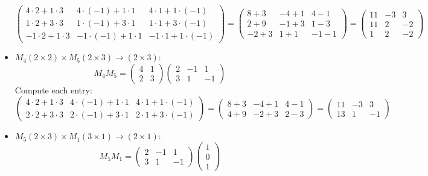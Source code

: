 \documentclass{article}
\begin{document}
\begin{itemize}
\[\begin{pmatrix}
        4 \cdot 2 + 1 \cdot 3 & 4 \cdot (-1) + 1 \cdot 1 & 4 \cdot 1 + 1 \cdot (-1) \\
        1 \cdot 2 + 3 \cdot 3 & 1 \cdot (-1) + 3 \cdot 1 & 1 \cdot 1 + 3 \cdot (-1) \\
        -1 \cdot 2 + 1 \cdot 3 & -1 \cdot (-1) + 1 \cdot 1 & -1 \cdot 1 + 1 \cdot (-1)
    \end{pmatrix}
    = \begin{pmatrix}
        8 + 3 & -4 + 1 & 4 - 1 \\
        2 + 9 & -1 + 3 & 1 - 3 \\
        -2 + 3 & 1 + 1 & -1 - 1
    \end{pmatrix}
    = \begin{pmatrix}
        11 & -3 & 3 \\
        11 & 2 & -2 \\
        1 & 2 & -2
    \end{pmatrix}
    \]
    \item \( M_4 (2 \times 2) \times M_5 (2 \times 3) \to (2 \times 3) \):
    \[
    M_4 M_5 = \begin{pmatrix} 4 & 1 \\ 2 & 3 \end{pmatrix} \begin{pmatrix} 2 & -1 & 1 \\ 3 & 1 & -1 \end{pmatrix}
    \]
    Compute each entry:
    \[
    \begin{pmatrix}
        4 \cdot 2 + 1 \cdot 3 & 4 \cdot (-1) + 1 \cdot 1 & 4 \cdot 1 + 1 \cdot (-1) \\
        2 \cdot 2 + 3 \cdot 3 & 2 \cdot (-1) + 3 \cdot 1 & 2 \cdot 1 + 3 \cdot (-1)
    \end{pmatrix}
    = \begin{pmatrix}
        8 + 3 & -4 + 1 & 4 - 1 \\
        4 + 9 & -2 + 3 & 2 - 3
    \end{pmatrix}
    = \begin{pmatrix}
        11 & -3 & 3 \\
        13 & 1 & -1
    \end{pmatrix}
    \]
    \item \( M_5 (2 \times 3) \times M_1 (3 \times 1) \to (2 \times 1) \):
    \[
    M_5 M_1 = \begin{pmatrix} 2 & -1 & 1 \\ 3 & 1 & -1 \end{pmatrix} \begin{pmatrix} 1 \\ 0 \\ 1 \end{pmatrix}
\]
\end{itemize}
\end{document}
